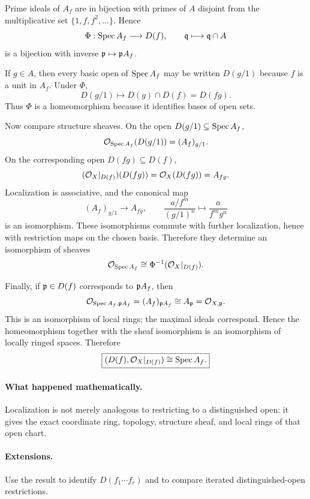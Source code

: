 \begin{solution}
Prime ideals of $A_f$ are in bijection with primes of $A$ disjoint from the multiplicative set $\{1,f,f^2,\dots\}$. Hence
\[
\Phi:\operatorname{Spec} A_f\longrightarrow D(f),\qquad \mathfrak q\longmapsto\mathfrak q\cap A
\]
is a bijection with inverse $\mathfrak p\mapsto\mathfrak p A_f$.

If $g\in A$, then every basic open of $\operatorname{Spec} A_f$ may be written $D(g/1)$ because $f$ is a unit in $A_f$. Under $\Phi$,
\[
D(g/1)\longmapsto D(g)\cap D(f)=D(fg).
\]
Thus $\Phi$ is a homeomorphism because it identifies bases of open sets.

Now compare structure sheaves. On the open $D(g/1)\subseteq\operatorname{Spec} A_f$,
\[
\mathcal O_{\operatorname{Spec} A_f}(D(g/1))=(A_f)_{g/1}.
\]
On the corresponding open $D(fg)\subseteq D(f)$,
\[
(\mathcal O_X|_{D(f)})(D(fg))=\mathcal O_X(D(fg))=A_{fg}.
\]
Localization is associative, and the canonical map
\[
(A_f)_{g/1}\longrightarrow A_{fg},\qquad
\frac{a/f^m}{(g/1)^n}\longmapsto\frac{a}{f^mg^n}
\]
is an isomorphism. These isomorphisms commute with further localization, hence with restriction maps on the chosen basis. Therefore they determine an isomorphism of sheaves
\[
\mathcal O_{\operatorname{Spec} A_f}\cong \Phi^{-1}(\mathcal O_X|_{D(f)}).
\]

Finally, if $\mathfrak p\in D(f)$ corresponds to $\mathfrak p A_f$, then
\[
\mathcal O_{\operatorname{Spec} A_f,\mathfrak p A_f}=(A_f)_{\mathfrak p A_f}\cong A_{\mathfrak p}=\mathcal O_{X,\mathfrak p}.
\]
This is an isomorphism of local rings; the maximal ideals correspond. Hence the homeomorphism together with the sheaf isomorphism is an isomorphism of locally ringed spaces. Therefore
\[
\boxed{(D(f),\mathcal O_X|_{D(f)})\cong\operatorname{Spec} A_f.}
\]
\end{solution}

\paragraph{What happened mathematically.}
Localization is not merely analogous to restricting to a distinguished open: it gives the exact coordinate ring, topology, structure sheaf, and local rings of that open chart.

\paragraph{Extensions.}
Use the result to identify $D(f_1\cdots f_r)$ and to compare iterated distinguished-open restrictions.
\fi

